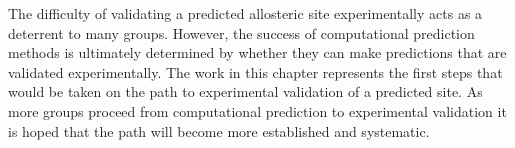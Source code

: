 The difficulty of validating a predicted allosteric site experimentally acts as a deterrent to many groups.
However, the success of computational prediction methods is ultimately determined by whether they can make predictions that are validated experimentally.
The work in this chapter represents the first steps that would be taken on the path to experimental validation of a predicted site.
As more groups proceed from computational prediction to experimental validation \cite{Brecher2017} it is hoped that the path will become more established and systematic.
